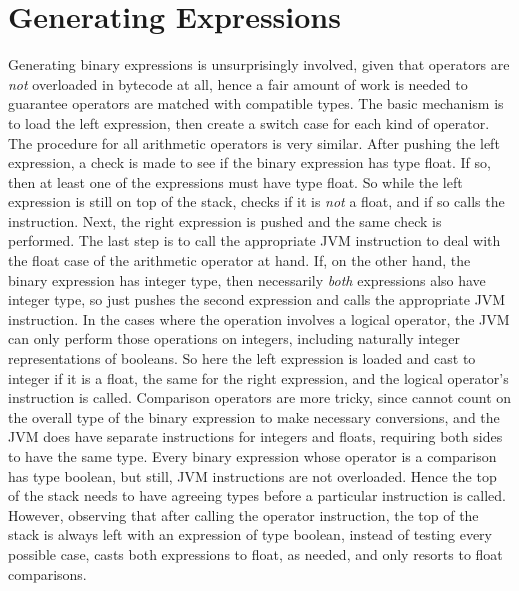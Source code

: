 \section{Generating Expressions}

Generating binary expressions is unsurprisingly involved, given that operators are \emph{not} overloaded in bytecode at all, hence a fair amount of work is needed to guarantee operators are matched with compatible types. The basic mechanism is to load the left expression, then create a switch case for each kind of operator. The procedure for all arithmetic operators is very similar. After pushing the left expression, a check is made to see if the binary expression has type float. If so, then at least one of the expressions must have type float. So while the left expression is still on top of the stack,  checks if it is \emph{not} a float, and if so calls the  instruction. Next, the right expression is pushed and the same check is performed. The last step is to call the appropriate JVM instruction to deal with the float case of the arithmetic operator at hand. If, on the other hand, the binary expression has integer type, then necessarily \emph{both} expressions also have integer type, so  just pushes the second expression and calls the appropriate JVM instruction. In the cases where the operation involves a logical operator, the JVM can only perform those operations on integers, including naturally integer representations of booleans. So here the left expression is loaded and cast to integer if it is a float, the same for the right expression, and the logical operator's instruction is called. Comparison operators are more tricky, since  cannot count on the overall type of the binary expression to make necessary conversions, and the JVM does have separate instructions for integers and floats, requiring both sides to have the same type. Every binary expression whose operator is a comparison has type boolean, but still, JVM instructions are not overloaded. Hence the top of the stack needs to have agreeing types before a particular instruction is called. However, observing that after calling the operator instruction, the top of the stack is always left with an expression of type boolean, instead of testing every possible case,  casts both expressions to float, as needed, and only resorts to float comparisons.

